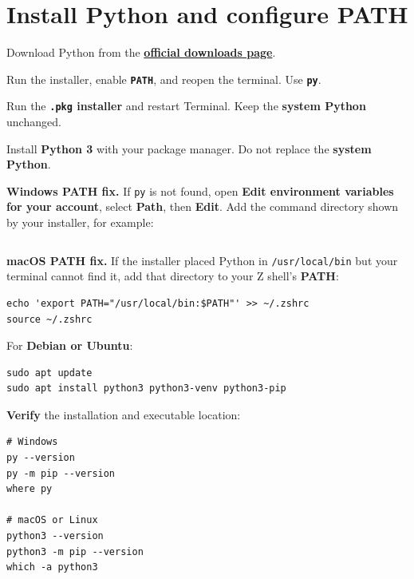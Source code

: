 \section{Install Python and configure PATH}

Download Python from the \href{https://www.python.org/downloads/}{\textbf{official downloads page}}.

\begin{description}[leftmargin=1.15in,style=nextline]
  \item[Windows] Run the installer, enable \textbf{\texttt{PATH}}, and reopen the terminal. Use \textbf{\texttt{py}}.
  \item[macOS] Run the \textbf{\texttt{.pkg} installer} and restart Terminal. Keep the \textbf{system Python} unchanged.
  \item[Linux] Install \textbf{Python 3} with your package manager. Do not replace the \textbf{system Python}.
\end{description}

\textbf{Windows PATH fix.} If \texttt{py} is not found, open \textbf{Edit environment variables for your account}, select \textbf{Path}, then \textbf{Edit}. Add the command directory shown by your installer, for example:

\begin{lstlisting}[style=mlterminal]
%LocalAppData%\Python\bin
\end{lstlisting}

\textbf{macOS PATH fix.} If the installer placed Python in \texttt{/usr/local/bin} but your terminal cannot find it, add that directory to your Z shell's \textbf{PATH}:

\begin{lstlisting}[style=mlterminal]
echo 'export PATH="/usr/local/bin:$PATH"' >> ~/.zshrc
source ~/.zshrc
\end{lstlisting}

For \textbf{Debian or Ubuntu}:

\begin{lstlisting}[style=mlterminal]
sudo apt update
sudo apt install python3 python3-venv python3-pip
\end{lstlisting}

\textbf{Verify} the installation and executable location:

\begin{lstlisting}[style=mlterminal]
# Windows
py --version
py -m pip --version
where py

# macOS or Linux
python3 --version
python3 -m pip --version
which -a python3
\end{lstlisting}

